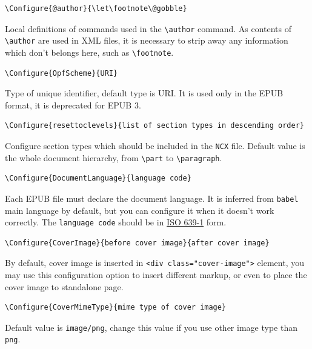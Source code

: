 \begin{verbatim}
\Configure{@author}{\let\footnote\@gobble}
\end{verbatim}

Local definitions of commands used in the
\texttt{\textbackslash{}author} command. As contents of
\texttt{\textbackslash{}author} are used in XML files, it is necessary
to strip away any information which don't belongs here, such as
\texttt{\textbackslash{}footnote}.

\begin{verbatim}
\Configure{OpfScheme}{URI}
\end{verbatim}

Type of unique identifier, default type is URI. It is used only in the
EPUB format, it is deprecated for EPUB 3.

\begin{verbatim}
\Configure{resettoclevels}{list of section types in descending order}
\end{verbatim}

Configure section types which should be included in the \texttt{NCX}
file. Default value is the whole document hierarchy, from
\texttt{\textbackslash{}part} to \texttt{\textbackslash{}paragraph}.

\begin{verbatim}
\Configure{DocumentLanguage}{language code}
\end{verbatim}

Each EPUB file must declare the document language. It is inferred from
\texttt{babel} main language by default, but you can configure it when
it doesn't work correctly. The \texttt{language\ code} should be in
\href{https://en.wikipedia.org/wiki/List_of_ISO_639-1_codes}{ISO 639-1}
form.

\begin{verbatim}
\Configure{CoverImage}{before cover image}{after cover image}
\end{verbatim}

By default, cover image is inserted in
\texttt{\textless{}div\ class="cover-image"\textgreater{}} element, you
may use this configuration option to insert different markup, or even to
place the cover image to standalone page.

\begin{verbatim}
\Configure{CoverMimeType}{mime type of cover image}
\end{verbatim}

Default value is \texttt{image/png}, change this value if you use other
image type than \texttt{png}.

